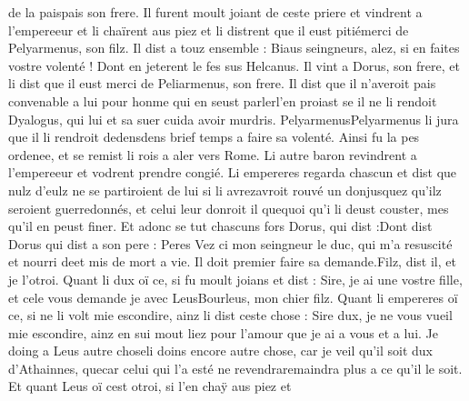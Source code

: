\documentclass{article}
\begin{document}
\begin{pages}
                  de la paispais son frere. 
               Il furent moult joiant de ceste priere et vindrent a l’empereeur et 
               li chaïrent aus piez et li distrent que il eust 
                  pitiémerci de 
                  Pelyarmenus, son filz. Il dist a touz ensemble :
               Biaus seingneurs, alez, si en faites vostre volenté !
               Dont en jeterent le fes sus Helcanus. 
               Il vint a Dorus, son frere, et li dist que 
               il eust merci de Peliarmenus, son frere. 
               Il dist que il n’averoit pais convenable a lui pour honme qui 
                  en seust parlerl'en proiast 
                  se il ne li rendoit Dyalogus, 
                  qui lui et sa suer cuida avoir murdris. 
               PelyarmenusPelyarmenus li jura que 
               il li rendroit dedensdens 
                  brief temps a faire sa volenté. \pend
            \pstart Ainsi fu la pes ordenee, et se remist 
               li rois a aler vers Rome. 
               Li autre baron revindrent a l’empereeur et vodrent prendre congié. 
               Li empereres regarda chascun et dist que 
               nulz d’eulz ne se partiroient de lui
               si li avrezavroit 
                  rouvé un donjusquez qu'ilz seroient guerredonnés, 
               et celui leur donroit il 
                  quequoi 
                  qu’i li deust couster, mes qu’il en peust finer. 
               Et adonc se tut chascuns fors 
                  Dorus, qui dist :Dont dist Dorus qui dist a son 
                     pere : Peres
               Vez ci mon seingneur le duc, qui m'a
                  resuscité et nourri 
                  deet mis de mort a vie. 
                  Il doit premier faire sa demande.Filz, dist il, et je l’otroi.
               Quant li dux oï ce, si fu moult joians et dist :
               Sire, je ai une vostre fille, 
                  et cele vous demande je avec 
                  LeusBourleus, 
                  mon chier filz.
               Quant li empereres oï ce, si ne li volt mie escondire, 
               ainz li dist ceste chose :
               Sire dux, je ne vous vueil mie escondire, 
                  ainz en sui mout liez pour l’amour que je ai a vous et a lui. 
                  Je doing 
                     a Leus autre choseli doins encore autre chose, 
                  car je veil qu’il soit dux  d’Athainnes, 
                  quecar celui qui l’a esté ne 
                  revendraremaindra plus a ce qu’il le soit.
               Et quant Leus oï cest otroi, si l’en chaÿ aus piez et 

\end{pages}
\end{document}
